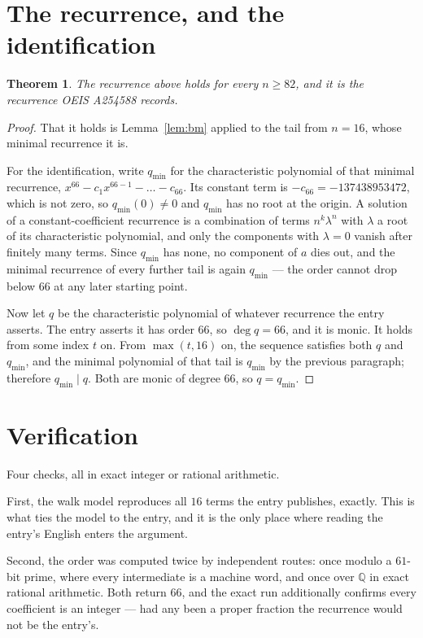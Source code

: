 \documentclass[11pt,a4paper]{article}
\theoremstyle{plain}
\newtheorem{theorem}{Theorem}
\theoremstyle{definition}
\begin{document}
\section{The recurrence, and the identification}

\begin{theorem}
The recurrence above holds for every $n\ge82$, and it is the recurrence OEIS A254588 records.
\end{theorem}

\begin{proof}
That it holds is Lemma~\ref{lem:bm} applied to the tail from $n=16$, whose minimal
recurrence it is.

For the identification, write $q_{\min}$ for the characteristic polynomial of that minimal
recurrence, $x^{66}-c_1x^{66-1}-\dots-c_{66}$. Its constant term is
$-c_{66}=-137438953472$, which is not zero, so $q_{\min}(0)\neq0$ and $q_{\min}$ has no
root at the origin. A solution of a constant-coefficient recurrence is a combination of terms
$n^{k}\lambda^{n}$ with $\lambda$ a root of its characteristic polynomial, and only the
components with $\lambda=0$ vanish after finitely many terms. Since $q_{\min}$ has none, no
component of $a$ dies out, and the minimal recurrence of every further tail is again
$q_{\min}$ --- the order cannot drop below $66$ at any later starting point.

Now let $q$ be the characteristic polynomial of whatever recurrence the entry asserts. The
entry asserts it has order $66$, so $\deg q=66$, and it is monic. It holds from some
index $t$ on. From $\max(t,16)$ on, the sequence satisfies both $q$ and $q_{\min}$, and
the minimal polynomial of that tail is $q_{\min}$ by the previous paragraph; therefore
$q_{\min}\mid q$. Both are monic of degree $66$, so $q=q_{\min}$.
\end{proof}

\section{Verification}

Four checks, all in exact integer or rational arithmetic.

First, the walk model reproduces all $16$ terms the entry publishes, exactly. This is
what ties the model to the entry, and it is the only place where reading the entry's English
enters the argument.

Second, the order was computed twice by independent routes: once modulo a $61$-bit prime, where
every intermediate is a machine word, and once over $\mathbb{Q}$ in exact rational arithmetic.
Both return $66$, and the exact run additionally confirms every coefficient is an integer
--- had any been a proper fraction the recurrence would not be the entry's.
\end{document}
